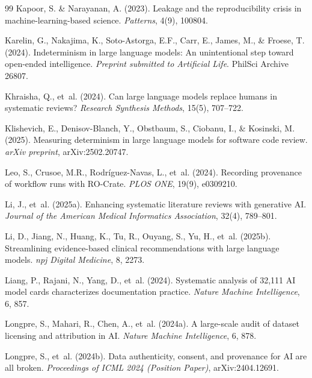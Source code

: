 \documentclass[12pt, a4paper]{article}
\begin{document}
\begin{thebibliography}{99}
Kapoor, S. \& Narayanan, A. (2023).
\newblock Leakage and the reproducibility crisis in machine-learning-based science.
\newblock \emph{Patterns}, 4(9), 100804.

Karelin, G., Nakajima, K., Soto-Astorga, E.F., Carr, E., James, M., \& Froese, T. (2024).
\newblock Indeterminism in large language models: An unintentional step toward open-ended intelligence.
\newblock \emph{Preprint submitted to Artificial Life}. PhilSci Archive 26807.

Khraisha, Q., et~al. (2024).
\newblock Can large language models replace humans in systematic reviews?
\newblock \emph{Research Synthesis Methods}, 15(5), 707--722.

Klishevich, E., Denisov-Blanch, Y., Obstbaum, S., Ciobanu, I., \& Kosinski, M. (2025).
\newblock Measuring determinism in large language models for software code review.
\newblock \emph{arXiv preprint}, arXiv:2502.20747.

Leo, S., Crusoe, M.R., Rodr\'iguez-Navas, L., et~al. (2024).
\newblock Recording provenance of workflow runs with RO-Crate.
\newblock \emph{PLOS ONE}, 19(9), e0309210.

Li, J., et~al. (2025a).
\newblock Enhancing systematic literature reviews with generative AI.
\newblock \emph{Journal of the American Medical Informatics Association}, 32(4), 789--801.

Li, D., Jiang, N., Huang, K., Tu, R., Ouyang, S., Yu, H., et~al. (2025b).
\newblock Streamlining evidence-based clinical recommendations with large language models.
\newblock \emph{npj Digital Medicine}, 8, 2273.

Liang, P., Rajani, N., Yang, D., et~al. (2024).
\newblock Systematic analysis of 32,111 AI model cards characterizes documentation practice.
\newblock \emph{Nature Machine Intelligence}, 6, 857.

Longpre, S., Mahari, R., Chen, A., et~al. (2024a).
\newblock A large-scale audit of dataset licensing and attribution in AI.
\newblock \emph{Nature Machine Intelligence}, 6, 878.

Longpre, S., et~al. (2024b).
\newblock Data authenticity, consent, and provenance for AI are all broken.
\newblock \emph{Proceedings of ICML 2024 (Position Paper)}, arXiv:2404.12691.


\end{thebibliography}
\end{document}
